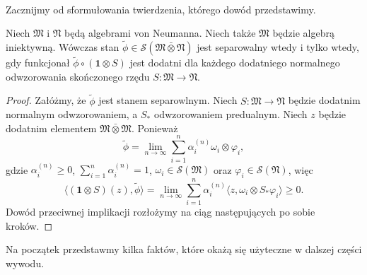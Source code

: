\paragraph{}
Zacznijmy od sformułowania twierdzenia, którego dowód przedstawimy.

\begin{Theorem}
    \label{thm:PHcrit}
    Niech $\mathfrak{M}$ i  $\mathfrak{N}$ będą algebrami von Neumanna.
    Niech także  $\mathfrak{M}$ będzie algebrą iniektywną.
    Wówczas stan $\tilde{\phi} \in \mathcal{S}(\mathfrak{M} \bar{\otimes} \mathfrak{N})$
    jest separowalny wtedy i tylko wtedy, gdy funkcjonał
    $\tilde{\phi} \circ (\mathbf{1} \otimes S)$
    jest dodatni dla każdego dodatniego normalnego odwzorowania skończonego rzędu
    $S\!: \mathfrak{M} \rightarrow \mathfrak{N}$.
\end{Theorem}

\begin{proof}


Załóżmy, że $\tilde{\phi}$ jest stanem separowlnym.
Niech $S: \mathfrak{M} \rightarrow \mathfrak{N}$ będzie
dodatnim normalnym odwzorowaniem, a $S_*$ odwzorowaniem predualnym.
Niech $z$ będzie dodatnim elementem
$\mathfrak{M} \bar{\otimes} \mathfrak{M}$.
Ponieważ
\begin{equation}
    \tilde{\phi} =\lim \limits_{n \rightarrow \infty}
\sum_{i=1}^{n}\alpha_i^{(n)} \omega_{i} \otimes \varphi_{i},
\end{equation}
gdzie
$\alpha_i^{(n)}\geq 0$, $\sum_{i=1}^n\alpha_i^{(n)}=1$,
$\omega_{i}\in\mathcal{S}(\mathfrak{M})$
oraz
$\varphi_{i}\in\mathcal{S}(\mathfrak{N})$,
więc
\begin{equation}
 \langle (\mathbf{1} \otimes S)(z), \tilde{\phi} \rangle =
 \lim \limits_{n \rightarrow \infty}\sum \limits_{i = 1}^{n}\alpha_i^{(n)}
 \langle z, \omega_{i} \otimes S_{*} \varphi_{i} \rangle \geq 0.
\end{equation}
Dowód przeciwnej implikacji rozłożymy na ciąg następujących po sobie kroków.
\end{proof}

Na początek przedstawmy kilka faktów, które okażą się użyteczne w dalszej
części wywodu.

